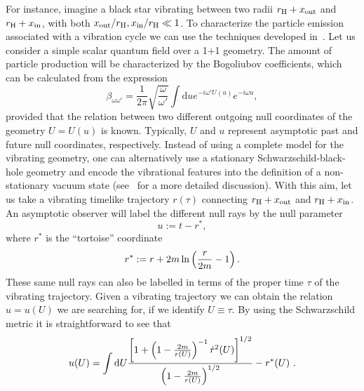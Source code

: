 \documentclass[12pt]{article}
\newcommand{\diff}{\text{d}}
\begin{document}
For instance, imagine a black star vibrating between two radii $r_\text{H}+x_{\rm
out}$ and $r_\text{H}+x_{\rm in}$, with both $x_{\rm out}/r_\text{H},x_{\rm in}/r_\text{H} \ll 1$. 
To characterize the particle emission associated with a vibration cycle we can 
use the techniques developed in~\cite{barcelo-min,barcelo-gen,barbado}.
Let us consider a simple scalar quantum field over a 1+1 geometry. The amount of 
particle production will be characterized by the Bogoliubov coefficients, which can be calculated from the expression~\cite{barcelo-rad-no-hor} 
%
\begin{equation}
\beta_{\omega \omega'} = \frac{1}{2 \pi} \sqrt{\frac{\omega}{\omega'}} \int \diff u e^{-i \omega' U(u)} e^{-i \omega u},
\label{scalar.prod.integral}
\end{equation}
%
 provided that the relation between two different outgoing null
coordinates of the geometry $U=U(u)$ is known. Typically, $U$ and $u$ represent
asymptotic past and future null coordinates, respectively. Instead of using a
complete model for the vibrating geometry, one can alternatively use  a
stationary Schwarzschild-black-hole geometry and encode the
vibrational features into the definition of a  non-stationary vacuum
state (see~\cite{barbado} for a more detailed discussion). With this aim, let us take
a vibrating timelike trajectory $r(\tau)$ connecting $r_\text{H}+x_{\rm out}$ and
$r_\text{H}+x_{\rm in}$. An asymptotic observer will label the different null rays  by
the null parameter 
%
\begin{equation}
u:= t-r^*, 
\label{rays}
\end{equation}
%
where $r^*$ is the ``tortoise'' coordinate
%
\begin{equation}
r^* := r + 2m \ln \left({r \over 2m} - 1 \right).
\label{tortoise}
\end{equation}
%
These same null rays can also  be labelled in terms of  the proper time $\tau$ of the vibrating trajectory. Given a vibrating 
trajectory we can obtain the relation $u=u(U)$ we are
searching for, if we identify $U \equiv \tau$. By using the Schwarzschild metric it is straightforward to see that 
%
\begin{align}
u(U) =  \int \diff U{ \left[1+ \left(1-{2m \over r(U)}\right)^{-1} \dot r^2(U)\right]^{1/2} \over  \left(1-{2m \over r(U)}\right)^{1/2} } -r^*(U)~.
\label{relation-complete}
\end{align}
%
 
\end{document}
